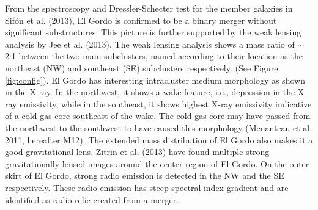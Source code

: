 From the spectroscopy and Dressler-Schecter test for the member galaxies  in Sif\'{o}n et al. (2013), El Gordo is confirmed to be a binary merger 
without significant substructures. This picture is further supported by the
weak lensing analysis by Jee et al. (2013). The weak lensing analysis shows
a mass ratio of $\sim$2:1  between the two main subclusters, named according to their location as the northeast (NW) and southeast (SE) subclusters respectively. 
(See Figure \ref{fig:config}). El Gordo has interesting intracluster medium morphology as shown in the X-ray. In the northwest, it shows a wake feature, i.e.,
depression in the X-ray emissivity, while in the southeast, it shows
highest X-ray emissivity indicative of a cold gas core southeast of the
wake. The cold gas core may have passed from the northwest to the southwest
to have caused this morphology (Menanteau et al. 2011, hereafter M12). 
The extended mass distribution of El Gordo also makes it a good
gravitational lens. Zitrin et al. (2013) have found multiple strong
gravitationally lensed images around the center region of El Gordo. 
On the outer skirt of El Gordo, strong radio emission is detected in
the NW and the SE respectively. These radio emission has steep spectral
index gradient and are identified as radio relic created from a merger.\par 
